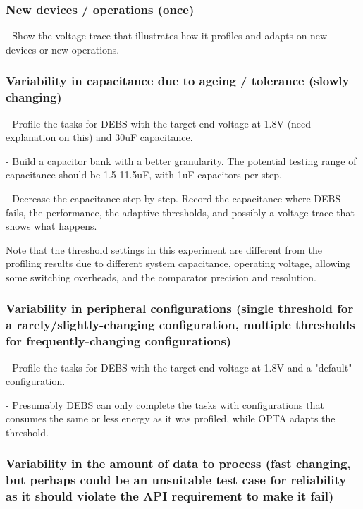 \subsubsection{New devices / operations (once)}

- Show the voltage trace that illustrates how it profiles and adapts on new devices or new operations. 

\subsubsection{Variability in capacitance due to ageing / tolerance (slowly changing)}

- Profile the tasks for DEBS with the target end voltage at 1.8V (need explanation on this) and 30uF capacitance. 

- Build a capacitor bank with a better granularity. The potential testing range of capacitance should be 1.5-11.5uF, with 1uF capacitors per step. 

- Decrease the capacitance step by step. Record the capacitance where DEBS fails, the performance, the adaptive thresholds, and possibly a voltage trace that shows what happens. 

Note that the threshold settings in this experiment are different from the profiling results due to different system capacitance, operating voltage, allowing some switching overheads, and the comparator precision and resolution. 

\subsubsection{Variability in peripheral configurations (single threshold for a rarely/slightly-changing configuration, multiple thresholds for frequently-changing configurations)}

- Profile the tasks for DEBS with the target end voltage at 1.8V and a "default" configuration. 
    
- Presumably DEBS can only complete the tasks with configurations that consumes the same or less energy as it was profiled, while OPTA adapts the threshold. 

\subsubsection{Variability in the amount of data to process (fast changing, but perhaps could be an unsuitable test case for reliability as it should violate the API requirement to make it fail)}
    
